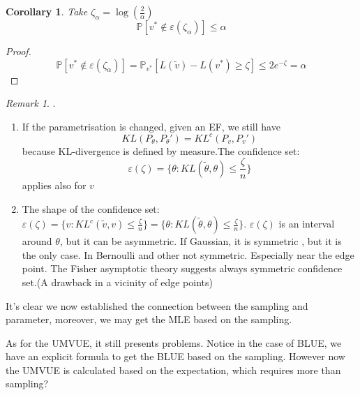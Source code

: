 \documentclass[a4paper,12pt, oneside, fleqn]{book}
\newtheorem{corollary}{Corollary}[theorem]
\theoremstyle{definition}
\theoremstyle{remark}
\newtheorem*{remark}{Remark}
\begin{document}
\begin{corollary}
	Take $\zeta_\alpha = \log (\frac{2}{\alpha})$
	\begin{equation*}
		\mathbb{P}[ v^* \notin \varepsilon(\zeta_\alpha)] \leq \alpha
	\end{equation*}
\end{corollary}

\begin{proof}
	\begin{equation*}
		\mathbb{P}[ v^* \notin \varepsilon(\zeta_\alpha)] = \mathbb{P}_{v^*} [L(\tilde{v}) - L(v^*) \geq \zeta] \leq 2 e^{-\zeta} = \alpha
	\end{equation*}
\end{proof}

\begin{remark}.
\begin{enumerate}
	\item If the parametrisation is changed, given an EF, we still have
		\begin{equation*}
				KL(P_\theta, P_\theta') = KL^c(P_v, P_v')
		\end{equation*}
		because KL-divergence is defined by measure.The confidence set:
		\begin{equation*}
			\varepsilon(\zeta) = \{\theta : KL(\tilde{\theta}, \theta ) \leq \frac{\zeta}{n} \}
		\end{equation*}
		applies also for $v$
	\item The shape of the confidence set:$\varepsilon(\zeta) = \{v : KL^c(\tilde{v}, v) \leq \frac{\zeta}{n} \} = \{\theta : KL(\tilde{\theta}, \theta ) \leq \frac{\zeta}{n} \}$. $\varepsilon(\zeta)$ is an interval around $\theta$, but it can be asymmetric.
If Gaussian, it is symmetric , but it is the only case. In Bernoulli and other not symmetric. Especially near the edge point. The Fisher asymptotic theory suggests always symmetric confidence set.(A drawback in a vicinity of edge points)
\end{enumerate}	
\end{remark}






It's clear we now established the connection between the sampling and parameter, moreover, we may get the MLE based on the sampling. \par 
As for the UMVUE, it still presents problems. Notice in the case of BLUE, we have an explicit formula to get the BLUE based on the sampling. However now the UMVUE is calculated based on the expectation, which requires more than sampling?\par 
\end{document}
